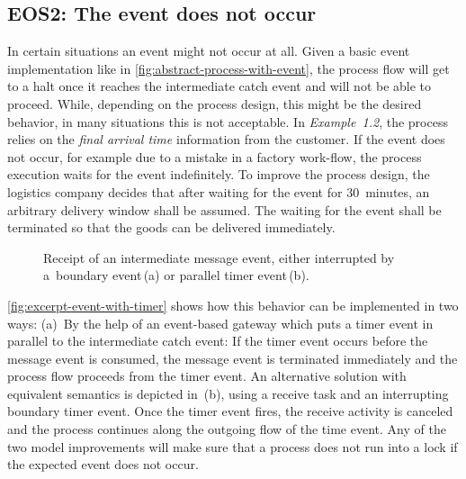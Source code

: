 \subsection*{EOS2: The event does not occur}

In certain situations an event might not occur at all. Given a basic event implementation like in \autoref{fig:abstract-process-with-event}, the process flow will get to a halt once it reaches the intermediate catch event and will not be able to proceed. While, depending on the process design, this might be the desired behavior, in many situations this is not acceptable.
In \textit{Example~1.2}, the process relies on the \textit{final arrival time} information from the customer. If the event does not occur, for example due to a mistake in a factory work-flow, the process execution waits for the event indefinitely.
To improve the process design, the logistics company decides that after waiting for the event for 30~minutes, an arbitrary delivery window shall be assumed. The waiting for the event shall be terminated so that the goods can be delivered immediately.

\begin{figure}[bth]
	\myfloatalign
	 \quad
	\caption{Receipt of an intermediate message event, either interrupted by a~boundary event\,(a) or parallel timer event\,(b).}
	\label{fig:excerpt-event-with-timer}
\end{figure}

\autoref{fig:excerpt-event-with-timer} shows how this behavior can be implemented in two ways: (a)~By the help of an event-based gateway which puts a timer event in parallel to the intermediate catch event: If the timer event occurs before the message event is consumed, the message event is terminated immediately and the process flow proceeds from the timer event.
An alternative solution with equivalent semantics is depicted in~(b), using a receive task and an interrupting boundary timer event. Once the timer event fires, the receive activity is canceled and the process continues along the outgoing flow of the time event.
Any of the two model improvements will make sure that a process does not run into a lock if the expected event does not occur.


